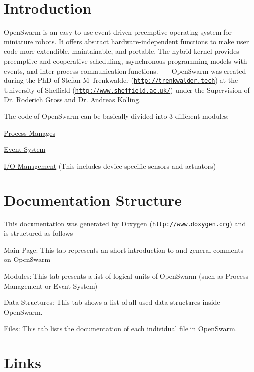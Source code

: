 \hypertarget{index_intro_sec}{}\section{Introduction}\label{index_intro_sec}
Open\+Swarm is an easy-\/to-\/use event-\/driven preemptive operating system for miniature robots. It offers abstract hardware-\/independent functions to make user code more extendible, maintainable, and portable. The hybrid kernel provides preemptive and cooperative scheduling, asynchronous programming models with events, and inter-\/process communication functions. ~\newline
~\newline
 Open\+Swarm was created during the Ph\+D of Stefan M Trenkwalder (\href{http://trenkwalder.tech}{\tt http\+://trenkwalder.\+tech}) at the University of Sheffield (\href{http://www.sheffield.ac.uk/}{\tt http\+://www.\+sheffield.\+ac.\+uk/}) under the Supervision of Dr. Roderich Gross and Dr. Andreas Kolling.

The code of Open\+Swarm can be basically divided into 3 different modules\+:
\begin{DoxyItemize}
\item \hyperlink{group__process}{Process Manages}
\item \hyperlink{group__events}{Event System}
\item \hyperlink{group__io}{I/\+O Management} (This includes device specific sensors and actuators)
\end{DoxyItemize}\hypertarget{index_brief_dec}{}\section{Documentation Structure}\label{index_brief_dec}
This documentation was generated by Doxygen (\href{http://www.doxygen.org}{\tt http\+://www.\+doxygen.\+org}) and is structured as follows
\begin{DoxyItemize}
\item Main Page\+: This tab represents an short introduction to and general comments on Open\+Swarm
\item Modules\+: This tab presents a list of logical units of Open\+Swarm (such as Process Management or Event System)
\item Data Structures\+: This tab shows a list of all used data structures inside Open\+Swarm.
\item Files\+: This tab lists the documentation of each individual file in Open\+Swarm.
\end{DoxyItemize}\hypertarget{index_link_sec}{}\section{Links}\label{index_link_sec}

